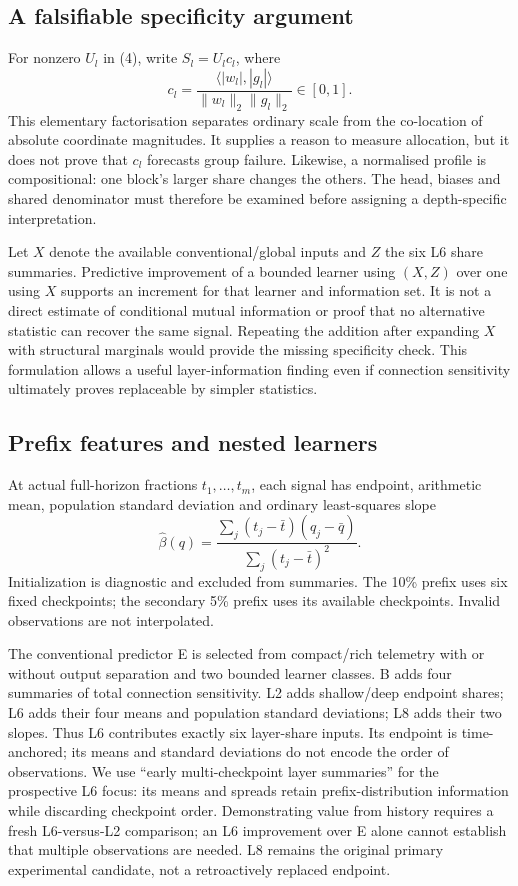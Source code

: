 \subsection{A falsifiable specificity argument}
For nonzero $U_l$ in (4), write $S_l=U_l c_l$, where
\begin{equation}
c_l=\frac{\langle|w_l|,|g_l|\rangle}{\|w_l\|_2\|g_l\|_2}\in[0,1].
\tag{5}\end{equation}
This elementary factorisation separates ordinary scale from the co-location of absolute coordinate magnitudes. It supplies a reason to measure allocation, but it does not prove that $c_l$ forecasts group failure. Likewise, a normalised profile is compositional: one block's larger share changes the others. The head, biases and shared denominator must therefore be examined before assigning a depth-specific interpretation.

Let $X$ denote the available conventional/global inputs and $Z$ the six L6 share summaries. Predictive improvement of a bounded learner using $(X,Z)$ over one using $X$ supports an increment for that learner and information set. It is not a direct estimate of conditional mutual information or proof that no alternative statistic can recover the same signal. Repeating the addition after expanding $X$ with structural marginals would provide the missing specificity check. This formulation allows a useful layer-information finding even if connection sensitivity ultimately proves replaceable by simpler statistics.

\subsection{Prefix features and nested learners}
At actual full-horizon fractions $t_1,\ldots,t_m$, each signal has endpoint, arithmetic mean, population standard deviation and ordinary least-squares slope
\begin{equation}
\widehat\beta(q)=\frac{\sum_j(t_j-\bar t)(q_j-\bar q)}{\sum_j(t_j-\bar t)^2}.
\label{eq:slope}
\tag{6}\end{equation}
Initialization is diagnostic and excluded from summaries. The 10\% prefix uses six fixed checkpoints; the secondary 5\% prefix uses its available checkpoints. Invalid observations are not interpolated.

The conventional predictor E is selected from compact/rich telemetry with or without output separation and two bounded learner classes. B adds four summaries of total connection sensitivity. L2 adds shallow/deep endpoint shares; L6 adds their four means and population standard deviations; L8 adds their two slopes. Thus L6 contributes exactly six layer-share inputs. Its endpoint is time-anchored; its means and standard deviations do not encode the order of observations. We use ``early multi-checkpoint layer summaries'' for the prospective L6 focus: its means and spreads retain prefix-distribution information while discarding checkpoint order. Demonstrating value from history requires a fresh L6-versus-L2 comparison; an L6 improvement over E alone cannot establish that multiple observations are needed. L8 remains the original primary experimental candidate, not a retroactively replaced endpoint.

